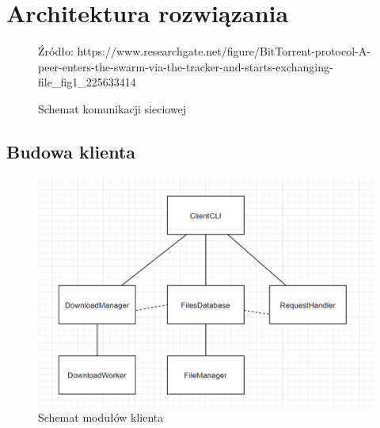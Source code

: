 \documentclass[11pt]{article}
\begin{document}
\section{Architektura rozwiązania}
\begin{figure}[h]
\caption{Schemat komunikacji sieciowej}
\centering
{}
{Źródło: https://www.researchgate.net/figure/BitTorrent-protocol-A-peer-enters-the-swarm-via-the-tracker-and-starts-exchanging-file\_fig1\_225633414}
\end{figure}
\clearpage
\subsection{Budowa klienta}
\begin{figure}[h]
\caption{Schemat modułów klienta}
\centering
\includegraphics[scale=0.4]{1}
\end{figure}
\end{document}
